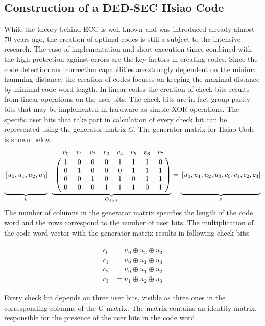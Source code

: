 \subsection{Construction of a DED-SEC Hsiao Code}
While the theory behind ECC is well known and was introduced already almost 70 years ago, the creation of optimal codes is still a subject to the intensive research. The ease of implementation and short execution times combined with the high protection against errors are the key factors in creating codes. Since the code detection and correction capabilities are strongly dependent on the minimal hamming distance, the creation of codes focuses on keeping the maximal distance by minimal code word length. In linear codes the creation of check bits results from linear operations on the user bits. The check bits are in fact group parity bits that may be implemented in hardware as simple XOR operations. The specific user bits that take part in calculation of every check bit can be represented using the generator matrix $G$. The generator matrix for Hsiao Code is shown below:
\begin{equation*}
\underbrace{
\vphantom{\bordermatrix{&&&&&&&&\cr &1&0&0&0&1&1&1&0\cr&0&1&0&0&0&1&1&1\cr&0&0&1&0&1&0&1&1\cr&0&0&0&1&1&1&0&1\cr}
}\left[u_0,u_1,u_2,u_3 \right ]}_{u}
\cdot 
\underbrace{\bordermatrix{
&v_0&v_1&v_2&v_3&v_4&v_5&v_6&v_7\cr 
&1&0&0&0&1&1&1&0\cr
&0&1&0&0&0&1&1&1\cr
&0&0&1&0&1&0&1&1\cr
&0&0&0&1&1&1&0&1\cr
}}_{G_{4\times 8}} = 
\underbrace{
\vphantom{\bordermatrix{&&&&&&&&\cr &1&0&0&0&1&1&1&0\cr&0&1&0&0&0&1&1&1\cr&0&0&1&0&1&0&1&1\cr&0&0&0&1&1&1&0&1\cr}
}\left[u_0,u_1,u_2,u_3,c_0,c_1,c_2,c_3 \right ]}_{v}
\end{equation*}
The number of columns in the generator matrix specifies the length of the code word and the rows correspond to the number of user bits. The multiplication of the code word vector with the generator matrix results in following check bits: 

\begin{align}
\begin{aligned}
c_0 &= u_0 \oplus u_2 \oplus u_3  \\
c_1 &= u_0 \oplus u_1 \oplus u_3  \\
c_2 &= u_0 \oplus u_1 \oplus u_2  \\
c_3 &= u_1 \oplus u_2 \oplus u_3 
\end{aligned}
\end{align}

Every check bit depends on three user bits, visible as three ones in the corresponding columns of the G matrix. The matrix contains an identity matrix, responsible for the presence of the user bits in the code word.

